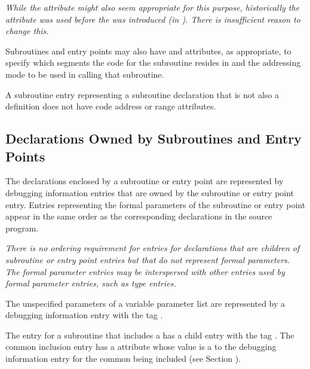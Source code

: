 \textit{While the 
\DWATentrypc{} attribute 
might 
also seem appropriate
for this purpose, historically the 
\DWATlowpc{} attribute
was used before the 
\DWATentrypc{} was introduced (in
). 
There is insufficient reason to change this.}


Subroutines 
and 
entry
points 
\hypertarget{chap:DWATaddressclasssubroutineorsubroutinetype}{}
may also have 
\DWATsegment{} 
and
\DWATaddressclass{} attributes,
as appropriate, to specify
which segments the code for the subroutine resides in and
the addressing mode to be used in calling that subroutine.

A subroutine entry representing a subroutine declaration
that is not also a definition does not have code address or
range attributes.


\subsection{Declarations Owned by Subroutines and Entry Points} 
\label{chap:declarationsownedbysubroutinesandentrypoints}

The declarations enclosed by a subroutine or entry point are
represented by debugging information entries that are owned
by the subroutine or entry point entry. Entries representing
the formal parameters of the subroutine or entry point appear
in the same order as the corresponding declarations in the
source program.

\textit{There is no ordering requirement for entries for declarations
that are children of subroutine or entry point entries but
that do not represent formal parameters. The formal parameter
entries may be interspersed with other entries used by formal
parameter entries, such as type entries.}

The unspecified parameters of a variable parameter list are
represented by a debugging information entry
with the tag
\DWTAGunspecifiedparametersTARG.

The entry for a subroutine that includes a
has a child entry with the 
tag \DWTAGcommoninclusionTARG. 
The
\hypertarget{chap:commonreferencecommonblockusage}{}
common inclusion entry has a 
\DWATcommonreference{} attribute
whose value is a  
to the debugging information entry
for the common  being included 
(see Section ).

